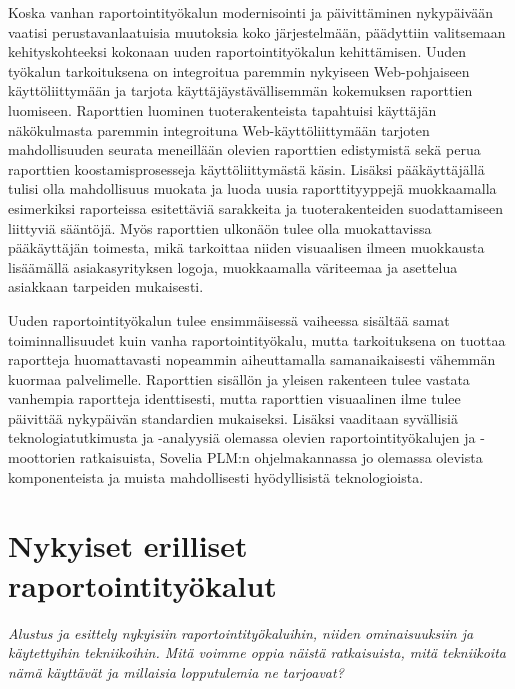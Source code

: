 Koska vanhan raportointityökalun modernisointi ja päivittäminen nykypäivään vaatisi perustavanlaatuisia muutoksia koko järjestelmään, päädyttiin valitsemaan kehityskohteeksi kokonaan uuden raportointityökalun kehittämisen. Uuden työkalun tarkoituksena on integroitua paremmin nykyiseen Web-pohjaiseen käyttöliittymään ja tarjota käyttäjäystävällisemmän kokemuksen raporttien luomiseen. Raporttien luominen tuoterakenteista tapahtuisi käyttäjän näkökulmasta paremmin integroituna Web-käyttöliittymään tarjoten mahdollisuuden seurata meneillään olevien raporttien edistymistä sekä perua raporttien koostamisprosesseja käyttöliittymästä käsin. Lisäksi pääkäyttäjällä tulisi olla mahdollisuus muokata ja luoda uusia raporttityyppejä muokkaamalla esimerkiksi raporteissa esitettäviä sarakkeita ja tuoterakenteiden suodattamiseen liittyviä sääntöjä. Myös raporttien ulkonäön tulee olla muokattavissa pääkäyttäjän toimesta, mikä tarkoittaa niiden visuaalisen ilmeen muokkausta lisäämällä asiakasyrityksen logoja, muokkaamalla väriteemaa ja asettelua asiakkaan tarpeiden mukaisesti.

Uuden raportointityökalun tulee ensimmäisessä vaiheessa sisältää samat toiminnallisuudet kuin vanha raportointityökalu, mutta tarkoituksena on tuottaa raportteja huomattavasti nopeammin aiheuttamalla samanaikaisesti vähemmän kuormaa palvelimelle. Raporttien sisällön ja yleisen rakenteen tulee vastata vanhempia raportteja identtisesti, mutta raporttien visuaalinen ilme tulee päivittää nykypäivän standardien mukaiseksi. Lisäksi vaaditaan syvällisiä teknologiatutkimusta ja -analyysiä olemassa olevien raportointityökalujen ja -moottorien ratkaisuista, Sovelia PLM:n ohjelmakannassa jo olemassa olevista komponenteista ja muista mahdollisesti hyödyllisistä teknologioista.

\section{Nykyiset erilliset raportointityökalut}

\textit{Alustus ja esittely nykyisiin raportointityökaluihin, niiden ominaisuuksiin ja käytettyihin tekniikoihin. Mitä voimme oppia näistä ratkaisuista, mitä tekniikoita nämä käyttävät ja millaisia lopputulemia ne tarjoavat?}

